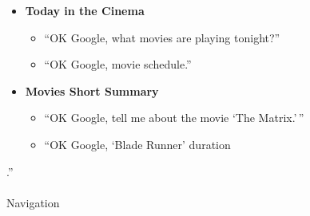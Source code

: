 \documentclass[
  a4paper,
]{article}
\makeatletter
\let\oldparagraph\paragraph
\renewcommand{\paragraph}{
    \@ifstar
      \xxxParagraphStar
      \xxxParagraphNoStar
  }
\newcommand{\xxxParagraphStar}[1]{\oldparagraph*{#1}\mbox{}}
\newcommand{\xxxParagraphNoStar}[1]{\oldparagraph{#1}\mbox{}}
\providecommand{\tightlist}{%
  \setlength{\itemsep}{0pt}\setlength{\parskip}{0pt}}\usepackage{longtable,booktabs,array}
\makeatother
\begin{document}
\begin{itemize}
\tightlist
\item
  \textbf{Today in the Cinema}

  \begin{itemize}
  \tightlist
  \item
    ``OK Google, what movies are playing tonight?''
  \item
    ``OK Google, movie schedule.''
  \end{itemize}
\item
  \textbf{Movies Short Summary}

  \begin{itemize}
  \tightlist
  \item
    ``OK Google, tell me about the movie `The Matrix.'\,''
  \item
    ``OK Google, `Blade Runner' duration
  \end{itemize}
\end{itemize}

.''

\paragraph{Navigation}\label{navigation}
\end{document}
